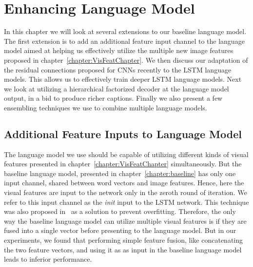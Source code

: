 \chapter{Enhancing Language Model}
\label{chapter:langModel}
In this chapter we will look at several extensions to our baseline language
model.
The first extension is to add an additional feature input channel to the
language model aimed at helping us effectively utilize the multiple new image
features proposed in chapter~\ref{chapter:VisFeatChapter}.
We then discuss our adaptation of the residual connections proposed for CNNs
recently to the LSTM language models.
This allows us to effectively train deeper LSTM language models.
Next we look at utilizing a hierarchical factorized decoder at the language
model output, in a bid to produce richer captions.
Finally we also present a few ensembling techniques we use to combine multiple
language models.

\section{Additional Feature Inputs to Language Model}
The language model we use should be capable of utilizing different kinds of
visual features presented in chapter~\ref{chapter:VisFeatChapter}
simultaneously.
But the baseline language model, presented in chapter~\ref{chapter:baseline} has
only one input channel, shared between word vectors and image features.
Hence, here the visual features are input to the network only in the zeroth
round of iteration.
We refer to this input channel as the \emph{init} input to the LSTM network.
This technique was also proposed in~\cite{Vinyals_2015_CVPR} as a solution to
prevent overfitting. 
Therefore, the only way the baseline language model can utilize multiple visual
features is if they are fused into a single vector before presenting to the
language model.
But in our experiments, we found that performing simple feature fusion, like
concatenating the two feature vectors, and using it as as input in the baseline
language model leads to inferior performance.


